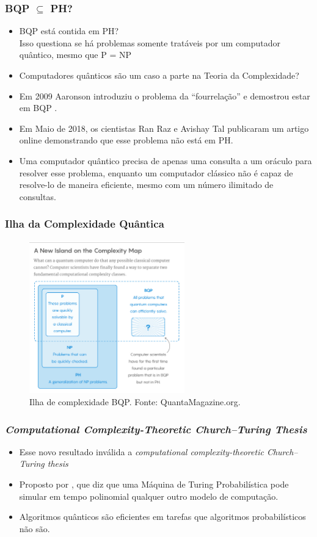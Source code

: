 \documentclass{beamer}
\begin{document}
\begin{frame}
\frametitle{BQP $\subseteq$ PH?} 
\begin{itemize}
  \item BQP está contida em PH?\\
   Isso questiona se há problemas somente tratáveis por um
   computador quântico, mesmo que P = NP
  \item Computadores quânticos são um caso a parte na Teoria da
   Complexidade?
  \item Em 2009 Aaronson introduziu o problema da ``fourrelação'' e
   demostrou estar em BQP \cite{aa:09}.
  \item Em Maio de 2018, os cientistas Ran Raz e Avishay Tal publicaram
   um artigo online \cite{ra:18} demonstrando que esse problema não
   está em PH.
  \item Uma computador quântico precisa de apenas uma consulta a um
   oráculo para resolver esse problema, enquanto um computador
   clássico não é capaz de resolve-lo de maneira eficiente, mesmo com
   um número ilimitado de consultas.
\end{itemize}
\end{frame}

\begin{frame}
  \frametitle{Ilha da Complexidade Quântica}
    \begin{figure}[h]
    \label{notph}
    \centering
    \includegraphics[width=0.6\textwidth]{island.jpg}
    \caption{Ilha de complexidade BQP. Fonte: QuantaMagazine.org.}
    \end{figure}
\end{frame}

\begin{frame}
\frametitle{\textit{Computational Complexity-Theoretic Church–Turing Thesis}} 
\begin{itemize}
  \item Esse novo resultado inválida a \textit{computational
    complexity-theoretic Church–Turing thesis}
  \item Proposto por \cite{be:97}, que diz que uma Máquina de Turing
  Probabilística pode simular em tempo polinomial qualquer outro
  modelo de computação.
  \item Algoritmos quânticos são eficientes em tarefas que
  algoritmos probabilísticos não são.
\end{itemize}
\end{frame}
\end{document}
